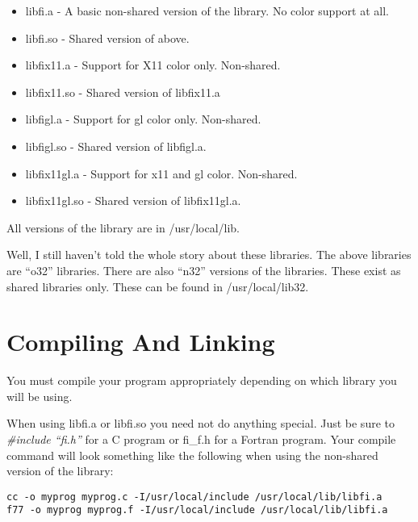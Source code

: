 \documentclass[letterpaper,11pt]{article}
\begin{document}
\begin{itemize}
        \item  libfi.a - A basic non-shared version of the library.  No color support at
all.

        \item  libfi.so - Shared version of above.

        \item  libfix11.a - Support for X11 color only.  Non-shared.

        \item  libfix11.so - Shared version of libfix11.a

        \item  libfigl.a - Support for gl color only.  Non-shared.

        \item  libfigl.so - Shared version of libfigl.a.

        \item  libfix11gl.a - Support for x11 and gl color.  Non-shared.

        \item  libfix11gl.so - Shared version of libfix11gl.a.
\end{itemize}

All versions of the library are in /usr/local/lib.

Well, I still haven't told the whole story about these libraries.  The 
above libraries are ``o32'' libraries.  There are also ``n32'' 
versions of the libraries.  These exist as shared libraries only.  
These can be found in /usr/local/lib32.  

\section{Compiling And Linking}

You must compile your program appropriately depending on which library you
will be using.

When using libfi.a or libfi.so you need not do anything special.  Just be
sure to \emph{\#include ``fi.h''} for a C program or fi\_f.h for a Fortran program.
Your compile command will look something like the following when using the
non-shared version of the library:

\begin{verbatim}
cc -o myprog myprog.c -I/usr/local/include /usr/local/lib/libfi.a
f77 -o myprog myprog.f -I/usr/local/include /usr/local/lib/libfi.a
\end{verbatim}
\end{document}
